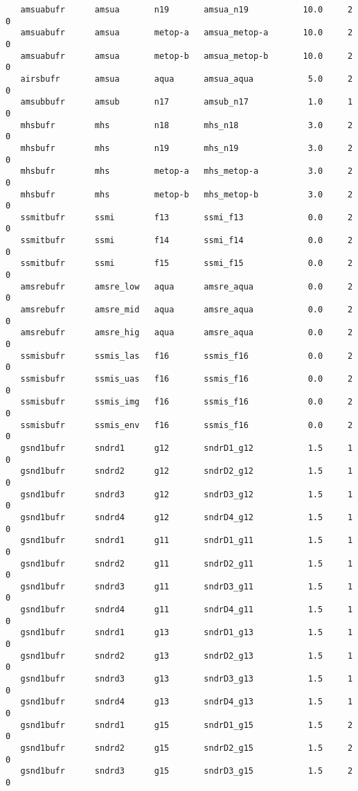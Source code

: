 \begin{scriptsize}
\begin{verbatim}
   amsuabufr      amsua       n19       amsua_n19           10.0     2     0
   amsuabufr      amsua       metop-a   amsua_metop-a       10.0     2     0
   amsuabufr      amsua       metop-b   amsua_metop-b       10.0     2     0
   airsbufr       amsua       aqua      amsua_aqua           5.0     2     0
   amsubbufr      amsub       n17       amsub_n17            1.0     1     0
   mhsbufr        mhs         n18       mhs_n18              3.0     2     0
   mhsbufr        mhs         n19       mhs_n19              3.0     2     0
   mhsbufr        mhs         metop-a   mhs_metop-a          3.0     2     0
   mhsbufr        mhs         metop-b   mhs_metop-b          3.0     2     0
   ssmitbufr      ssmi        f13       ssmi_f13             0.0     2     0
   ssmitbufr      ssmi        f14       ssmi_f14             0.0     2     0
   ssmitbufr      ssmi        f15       ssmi_f15             0.0     2     0
   amsrebufr      amsre_low   aqua      amsre_aqua           0.0     2     0
   amsrebufr      amsre_mid   aqua      amsre_aqua           0.0     2     0
   amsrebufr      amsre_hig   aqua      amsre_aqua           0.0     2     0
   ssmisbufr      ssmis_las   f16       ssmis_f16            0.0     2     0
   ssmisbufr      ssmis_uas   f16       ssmis_f16            0.0     2     0
   ssmisbufr      ssmis_img   f16       ssmis_f16            0.0     2     0
   ssmisbufr      ssmis_env   f16       ssmis_f16            0.0     2     0
   gsnd1bufr      sndrd1      g12       sndrD1_g12           1.5     1     0
   gsnd1bufr      sndrd2      g12       sndrD2_g12           1.5     1     0
   gsnd1bufr      sndrd3      g12       sndrD3_g12           1.5     1     0
   gsnd1bufr      sndrd4      g12       sndrD4_g12           1.5     1     0
   gsnd1bufr      sndrd1      g11       sndrD1_g11           1.5     1     0
   gsnd1bufr      sndrd2      g11       sndrD2_g11           1.5     1     0
   gsnd1bufr      sndrd3      g11       sndrD3_g11           1.5     1     0
   gsnd1bufr      sndrd4      g11       sndrD4_g11           1.5     1     0
   gsnd1bufr      sndrd1      g13       sndrD1_g13           1.5     1     0
   gsnd1bufr      sndrd2      g13       sndrD2_g13           1.5     1     0
   gsnd1bufr      sndrd3      g13       sndrD3_g13           1.5     1     0
   gsnd1bufr      sndrd4      g13       sndrD4_g13           1.5     1     0
   gsnd1bufr      sndrd1      g15       sndrD1_g15           1.5     2     0
   gsnd1bufr      sndrd2      g15       sndrD2_g15           1.5     2     0
   gsnd1bufr      sndrd3      g15       sndrD3_g15           1.5     2     0

\end{verbatim}
\end{scriptsize}

